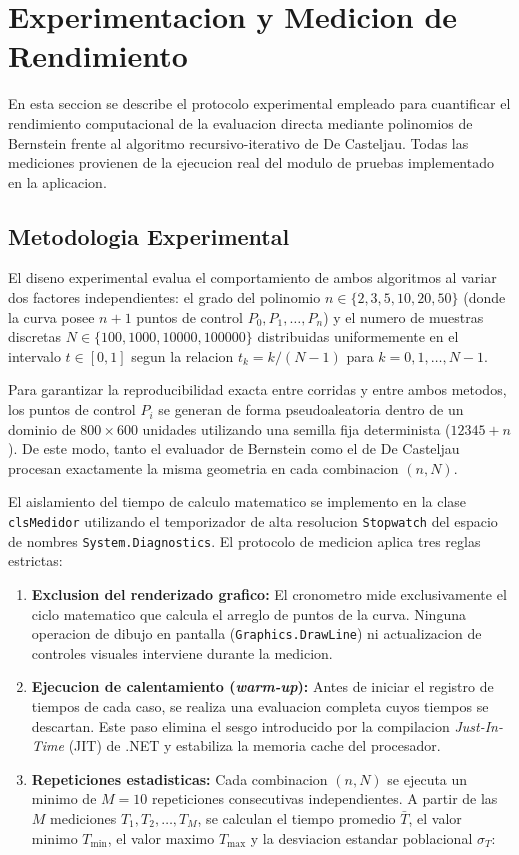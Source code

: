 \section{Experimentacion y Medicion de Rendimiento}
\label{sec:experimentacion}

En esta seccion se describe el protocolo experimental empleado para cuantificar el rendimiento computacional de la evaluacion directa mediante polinomios de Bernstein frente al algoritmo recursivo-iterativo de De Casteljau. Todas las mediciones provienen de la ejecucion real del modulo de pruebas implementado en la aplicacion.

\subsection{Metodologia Experimental}
\label{subsec:exp_metodologia}

El diseno experimental evalua el comportamiento de ambos algoritmos al variar dos factores independientes: el grado del polinomio $n \in \{2, 3, 5, 10, 20, 50\}$ (donde la curva posee $n + 1$ puntos de control $P_0, P_1, \dots, P_n$) y el numero de muestras discretas $N \in \{100, 1000, 10000, 100000\}$ distribuidas uniformemente en el intervalo $t \in [0, 1]$ segun la relacion $t_k = k / (N - 1)$ para $k = 0, 1, \dots, N - 1$.

Para garantizar la reproducibilidad exacta entre corridas y entre ambos metodos, los puntos de control $P_i$ se generan de forma pseudoaleatoria dentro de un dominio de $800 \times 600$ unidades utilizando una semilla fija determinista ($12345 + n$). De este modo, tanto el evaluador de Bernstein como el de De Casteljau procesan exactamente la misma geometria en cada combinacion $(n, N)$.

El aislamiento del tiempo de calculo matematico se implemento en la clase \texttt{clsMedidor} utilizando el temporizador de alta resolucion \texttt{Stopwatch} del espacio de nombres \texttt{System.Diagnostics}. El protocolo de medicion aplica tres reglas estrictas:

\begin{enumerate}
    \item \textbf{Exclusion del renderizado grafico:} El cronometro mide exclusivamente el ciclo matematico que calcula el arreglo de puntos de la curva. Ninguna operacion de dibujo en pantalla (\texttt{Graphics.DrawLine}) ni actualizacion de controles visuales interviene durante la medicion.
    \item \textbf{Ejecucion de calentamiento (\textit{warm-up}):} Antes de iniciar el registro de tiempos de cada caso, se realiza una evaluacion completa cuyos tiempos se descartan. Este paso elimina el sesgo introducido por la compilacion \textit{Just-In-Time} (JIT) de .NET y estabiliza la memoria cache del procesador.
    \item \textbf{Repeticiones estadisticas:} Cada combinacion $(n, N)$ se ejecuta un minimo de $M = 10$ repeticiones consecutivas independientes. A partir de las $M$ mediciones $T_1, T_2, \dots, T_M$, se calculan el tiempo promedio $\bar{T}$, el valor minimo $T_{\min}$, el valor maximo $T_{\max}$ y la desviacion estandar poblacional $\sigma_T$:
\end{enumerate}

